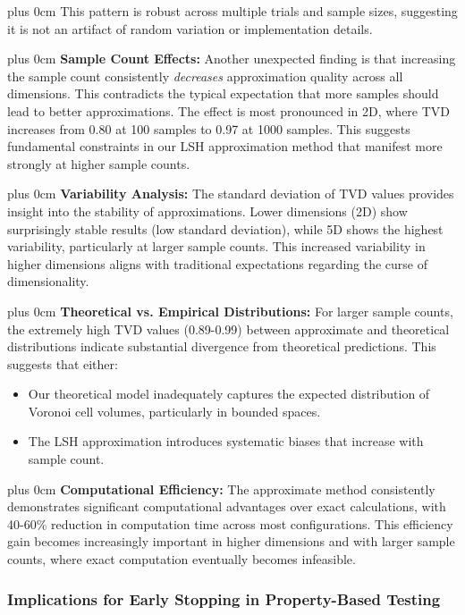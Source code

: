 \documentclass[conference]{IEEEtran}
\newcommand{\justifytext}{\leftskip=0pt \rightskip=0pt plus 0cm}
\begin{document}
\justifytext
This pattern is robust across multiple trials and sample sizes, suggesting it is not an artifact of random variation or implementation details.

\justifytext
\textbf{Sample Count Effects:} Another unexpected finding is that increasing the sample count consistently \textit{decreases} approximation quality across all dimensions. This contradicts the typical expectation that more samples should lead to better approximations. The effect is most pronounced in 2D, where TVD increases from 0.80 at 100 samples to 0.97 at 1000 samples. This suggests fundamental constraints in our LSH approximation method that manifest more strongly at higher sample counts.

\justifytext
\textbf{Variability Analysis:} The standard deviation of TVD values provides insight into the stability of approximations. Lower dimensions (2D) show surprisingly stable results (low standard deviation), while 5D shows the highest variability, particularly at larger sample counts. This increased variability in higher dimensions aligns with traditional expectations regarding the curse of dimensionality.

\justifytext
\textbf{Theoretical vs. Empirical Distributions:} For larger sample counts, the extremely high TVD values (0.89-0.99) between approximate and theoretical distributions indicate substantial divergence from theoretical predictions. This suggests that either:
\begin{itemize}
    \item Our theoretical model inadequately captures the expected distribution of Voronoi cell volumes, particularly in bounded spaces.
    \item The LSH approximation introduces systematic biases that increase with sample count.
\end{itemize}

\justifytext
\textbf{Computational Efficiency:} The approximate method consistently demonstrates significant computational advantages over exact calculations, with 40-60\% reduction in computation time across most configurations. This efficiency gain becomes increasingly important in higher dimensions and with larger sample counts, where exact computation eventually becomes infeasible.

\subsubsection{Implications for Early Stopping in Property-Based Testing}
\end{document}
